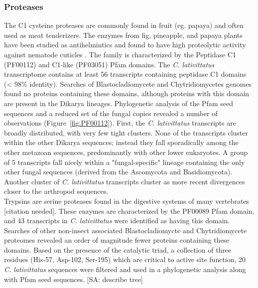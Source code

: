 \subsubsection*{Proteases} 
The C1 cysteine proteases are commonly found in fruit (eg. papaya) and often used as meat tenderizers. The enzymes from fig, pineapple, and papaya plants have been studied as antihelmintics and found to have high proteolytic activity against nematode cuticles \cite{Stepek2004}. The family is characterized by the Peptidase C1 (PF00112) and C1-like (PF03051) Pfam domains. The \textit{C. lativittatus} transcriptome contains at least 56 transcripts containing peptidase C1 domains (< 98\% identity). Searches of Blastocladiomycete and Chytridiomycetes genomes found no proteins containing these domains, although proteins with this domain are present in the Dikarya lineages. Phylogenetic analysis of the Pfam seed sequences and a reduced set of the fungal copies revealed a number of observations (Figure~\ref{fig:PF00112}). First, the \textit{C. lativittatus} transcripts are broadly distributed, with very few tight clusters. None of the transcripts cluster within the other Dikarya sequences; instead they fall sporadically among the other metazoan sequences, predominantly with other lower eukaryotes. A group of 5 transcripts fall nicely within a "fungal-specific" lineage containing the only other fungal sequences (derived from the Ascomycota and Basidiomycota). Another cluster of \textit{C. lativittatus} transcripts cluster as more recent divergences closer to the arthropod sequences. \\
\indent Trypsins are serine proteases found in the digestive systems of many vertebrates [citation needed]. These enzymes are characterized by the PF00089 Pfam domain, and 43 transcripts in \textit{C. lativittatus} were identified as having this domain. Searches of other non-insect associated Blastocladiomycte and Chytridiomycete proteomes revealed an order of magnitude fewer proteins containing these domains. Based on the presence of the catalytic triad, a collection of three residues (His-57, Asp-102, Ser-195) which are critical to active site function, 20 \textit{C. lativittatus} sequences were filtered and used in a phylogenetic analysis along with Pfam seed sequences. [SA: describe tree]\\
